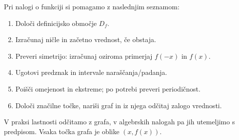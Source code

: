 \documentclass[a4paper,12pt]{article}
\begin{document}
Pri nalogi o funkciji si pomagamo z naslednjim seznamom:
\begin{enumerate}[leftmargin=*,itemsep=0.45em,topsep=0.4em]
	\item Določi definicijsko območje $D_f$.
	\item Izračunaj ničle in začetno vrednost, če obstaja.
	\item Preveri simetrijo: izračunaj oziroma primerjaj $f(-x)$ in $f(x)$.
	\item Ugotovi predznak in intervale naraščanja/padanja.
	\item Poišči omejenost in ekstreme; po potrebi preveri periodičnost.
	\item Določi značilne točke, nariši graf in iz njega odčitaj zalogo vrednosti.
\end{enumerate}
V praksi lastnosti odčitamo z grafa, v algebrskih nalogah pa jih utemeljimo s predpisom. Vsaka točka grafa je oblike $(x,f(x))$.
\end{document}

